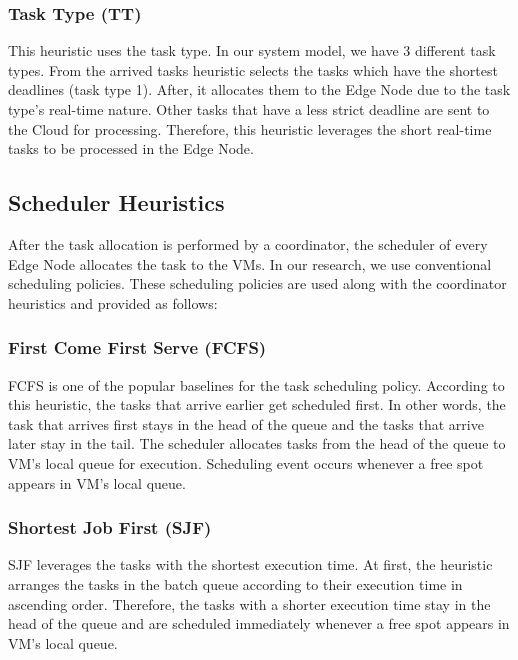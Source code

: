 \subsubsection{\textbf{Task Type (TT)}}
This heuristic uses the task type. In our system model, we have 3 different task types. From the arrived tasks heuristic selects the tasks which have the shortest deadlines (task type 1). After, it allocates them to the Edge Node due to the task type's real-time nature. Other tasks that have a less strict deadline are sent to the Cloud for processing. Therefore, this heuristic leverages the short real-time tasks to be processed in the Edge Node.
\subsection{\textbf{Scheduler Heuristics}}
After the task allocation is performed by a coordinator, the scheduler of every Edge Node allocates the task to the VMs. In our research, we use conventional scheduling policies. These scheduling policies are used along with the coordinator heuristics and provided as follows:\

\subsubsection{First Come First Serve (FCFS)}
FCFS is one of the popular baselines for the task scheduling policy. According to this heuristic, the tasks that arrive earlier get scheduled first. In other words, the task that arrives first stays in the head of the queue and the tasks that arrive later stay in the tail. The scheduler allocates tasks from the head of the queue to VM's local queue for execution. Scheduling event occurs whenever a free spot appears in VM's local queue.

\subsubsection{Shortest Job First (SJF)}
SJF leverages the tasks with the shortest execution time. At first, the heuristic arranges the tasks in the batch queue according to their execution time in ascending order. Therefore, the tasks with a shorter execution time stay in the head of the queue and are scheduled immediately whenever a free spot appears in VM's local queue.

    